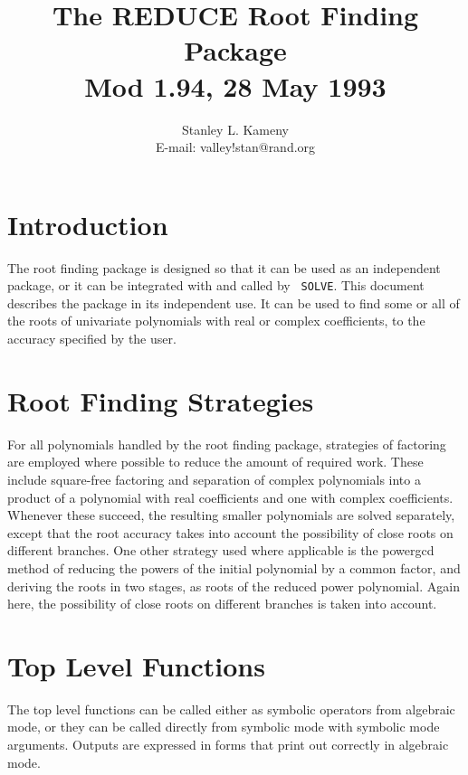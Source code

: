 \title{The REDUCE Root Finding Package \\ Mod 1.94, 28 May 1993}
\date{}
\author {Stanley L. Kameny \\ E-mail: valley!stan@rand.org}

\maketitle
{} 

\section{Introduction}

The root finding package is designed so that it can be used as an
independent package, or it can be integrated with and called by {\tt
SOLVE}.  This document describes
the package in its independent use.  It can be used to find some or all of
the roots of univariate polynomials with real or complex coefficients, to
the accuracy specified by the user.

\section{Root Finding Strategies}

For all polynomials handled by the root finding package, strategies of
factoring are employed where possible to reduce the amount of required
work.  These include square-free factoring and separation of complex
polynomials into a product of a polynomial with real coefficients and one
with complex coefficients.  Whenever these succeed, the resulting smaller
polynomials are solved separately, except that the root accuracy takes
into account the possibility of close roots on different branches.  One
other strategy used where applicable is the powergcd method of reducing
the powers of the initial polynomial by a common factor, and deriving the
roots in two stages, as roots of the reduced power polynomial.  Again
here, the possibility of close roots on different branches is taken into
account.

\section{Top Level Functions}

The top level functions can be called either as symbolic operators from
algebraic mode, or they can be called directly from symbolic mode with
symbolic mode arguments.  Outputs are expressed in forms that print out
correctly in algebraic mode.


